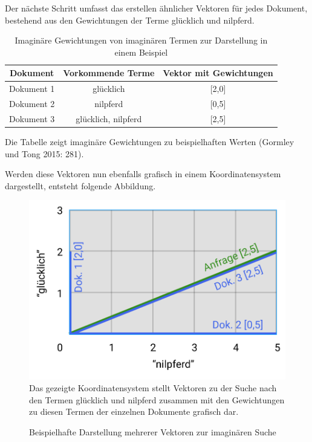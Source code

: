 \documentclass[a4paper]{scrartcl}
\begin{document}
Der nächste Schritt umfasst das erstellen ähnlicher Vektoren für jedes Dokument, bestehend aus den Gewichtungen der Terme glücklich und nilpferd. \\

\begin{table}[htb]
	\centering
	\caption{Imaginäre Gewichtungen von imaginären Termen zur Darstellung in einem Beispiel}
	\begin{center}
		
		\begin{tabular}{| c | c | c |}
			\hline
			Dokument & Vorkommende Terme & Vektor mit Gewichtungen \\ [0.5ex]
			\hline \hline
			Dokument 1 & glücklich & [2,0] \\
			\hline
			Dokument 2 & nilpferd & [0,5] \\
			\hline
			Dokument 3 & glücklich, nilpferd & [2,5] \\
			\hline
		\end{tabular}
	\end{center}
	Die Tabelle zeigt imaginäre Gewichtungen zu beispielhaften Werten (Gormley und Tong 2015: 281).
\end{table} 

Werden diese Vektoren nun ebenfalls grafisch in einem Koordinatensystem dargestellt, entsteht folgende Abbildung.

\begin{figure}[h!]
	\centering
	\caption{Beispielhafte Darstellung mehrerer Vektoren zur imaginären Suche}
	\includegraphics[scale=0.35]{assets/Diagram_2} \\
	Das gezeigte Koordinatensystem stellt Vektoren zu der Suche nach den Termen glücklich und nilpferd zusammen mit den Gewichtungen zu diesen Termen der einzelnen Dokumente grafisch dar.
\end{figure}
\end{document}
